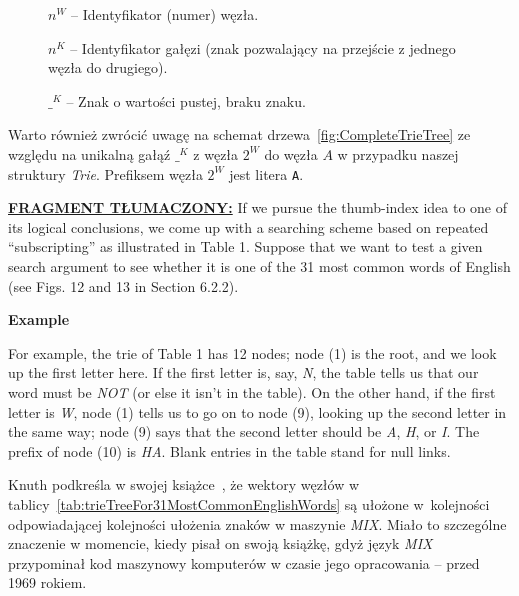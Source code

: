 \begin{figure}
			
		\begin{tablenotes}
			\centering
			\footnotesize
			\item $n^W$ -- Identyfikator (numer) węzła.
			\item $n^K$ -- Identyfikator gałęzi (znak pozwalający na przejście z jednego węzła do drugiego).
			\item $\_^K$ -- Znak o wartości pustej, braku znaku.
		\end{tablenotes}
	\end{figure}
	
	Warto również zwrócić uwagę na schemat drzewa~\ref{fig:CompleteTrieTree} ze względu na unikalną gałąź $\_^K$ z węzła $2^W$ do węzła $A$ w przypadku naszej struktury \emph{Trie}. Prefiksem węzła $2^W$ jest litera \texttt{A}.
	
	\ifsourcematerial
	\begin{displayquote}
		\color{ao(english)}
		\underline{\textbf{FRAGMENT TŁUMACZONY:}} \newline
		\elide If we pursue the thumb-index idea to one of its logical conclusions, we come
		up with a searching scheme based on repeated “subscripting” as illustrated in
		Table 1. Suppose that we want to test a given search argument to see whether it
		is one of the 31 most common words of English (see Figs. 12 and 13 in Section
		6.2.2). \elide 
		
		\textbf{\color{ao(english)} Example}
		
		For example, the trie of Table 1 has 12 nodes; node (1) is the root, and we
		look up the first letter here. If the first letter is, say, \emph{N}, the table tells us that our word must be \emph{NOT} (or else it isn’t in the table). On the other hand, if the first letter is \emph{W}, node (1) tells us to go on to node (9), looking up the second letter in the same way; node (9) says that the second letter should be \emph{A}, \emph{H}, or \emph{I}. The prefix of node (10) is \emph{HA}. Blank entries in the table stand for null links.
	\end{displayquote}
	\fi
	
	Knuth podkreśla w swojej książce~\cite{KnuthsTheArtOfComputerProgramming3}, że wektory węzłów w tablicy~\ref{tab:trieTreeFor31MostCommonEnglishWords} są ułożone w~kolejności odpowiadającej kolejności ułożenia znaków w maszynie \emph{MIX}. Miało to szczególne znaczenie w momencie, kiedy pisał on swoją książkę, gdyż język \emph{MIX} przypominał kod maszynowy komputerów w czasie jego opracowania -- przed 1969 rokiem.
	
